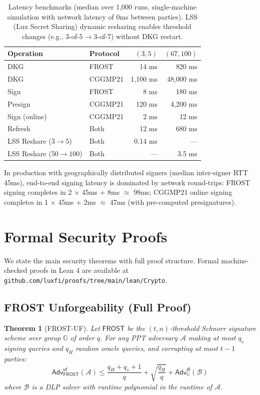 \documentclass[11pt,twocolumn]{article}
\newtheorem{theorem}{Theorem}[section]
\begin{document}
\begin{table}[H]
\centering
\small
\begin{tabular}{@{}llrr@{}}
\toprule
\textbf{Operation} & \textbf{Protocol} & \textbf{$(3,5)$} & \textbf{$(67,100)$} \\
\midrule
DKG & FROST & 14 ms & 820 ms \\
DKG & CGGMP21 & 1,100 ms & 48,000 ms \\
Sign & FROST & 8 ms & 180 ms \\
Presign & CGGMP21 & 120 ms & 4,200 ms \\
Sign (online) & CGGMP21 & 2 ms & 12 ms \\
Refresh & Both & 12 ms & 680 ms \\
LSS Reshare ($3 \to 5$) & Both & 0.14 ms & --- \\
LSS Reshare ($50 \to 100$) & Both & --- & 3.5 ms \\
\bottomrule
\end{tabular}
\caption{Latency benchmarks (median over 1,000 runs, single-machine simulation with
network latency of 0ms between parties). LSS (Lux Secret Sharing) dynamic resharing
enables threshold changes (e.g., $3$-of-$5 \to 3$-of-$7$) without DKG restart.}
\label{tab:perf}
\end{table}

In production with geographically distributed signers (median inter-signer RTT 45ms),
end-to-end signing latency is dominated by network round-trips: FROST signing
completes in 2 $\times$ 45ms + 8ms $\approx$ 98ms; CGGMP21 online signing completes
in 1 $\times$ 45ms + 2ms $\approx$ 47ms (with pre-computed presignatures).

\section{Formal Security Proofs}
\label{sec:proofs}

We state the main security theorems with full proof structure. Formal machine-checked
proofs in Lean 4 are available at
\texttt{github.com/luxfi/proofs/tree/main/lean/Crypto}.

\subsection{FROST Unforgeability (Full Proof)}

\begin{theorem}[FROST-UF]
\label{thm:frost-uf-full}
Let $\mathsf{FROST}$ be the $(t,n)$-threshold Schnorr signature scheme over group
$\mathbb{G}$ of order $q$. For any PPT adversary $\mathcal{A}$ making at most $q_s$
signing queries and $q_H$ random oracle queries, and corrupting at most $t-1$ parties:
\[
  \mathsf{Adv}^{\mathsf{uf}}_{\mathsf{FROST}}(\mathcal{A}) \leq
    \frac{q_H + q_s + 1}{q} + \sqrt{\frac{q_H}{q}} +
    \mathsf{Adv}^{\mathsf{dl}}_{\mathbb{G}}(\mathcal{B})
\]
where $\mathcal{B}$ is a DLP solver with runtime polynomial in the runtime of
$\mathcal{A}$.
\end{theorem}
\end{document}
